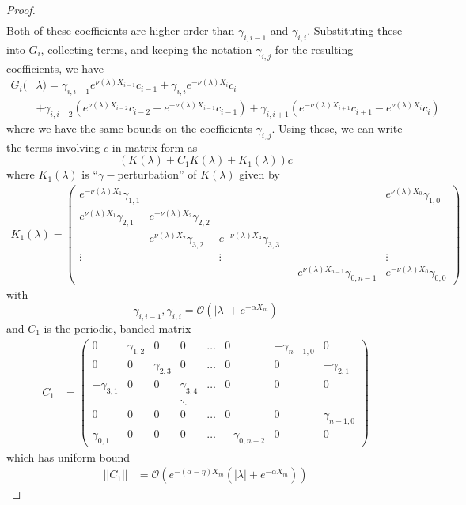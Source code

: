 \documentclass[thesis.tex]{subfiles}
\begin{document}
\begin{lemma}
\begin{proof}
\begin{align*}
\end{align*}
Both of these coefficients are higher order than $\gamma_{i,i-1}$ and $\gamma_{i,i}$. Substituting these into $G_i$, collecting terms, and keeping the notation $\gamma_{i,j}$ for the resulting coefficients, we have
\begin{align*}
G_i(&\lambda) = \gamma_{i,i-1} e^{\nu(\lambda)X_{i-1}}c_{i-1} + \gamma_{i,i} e^{-\nu(\lambda)X_i}c_i \\
&+ \gamma_{i,i-2} ( e^{\nu(\lambda)X_{i-2}}c_{i-2} - e^{-\nu(\lambda)X_{i-1}}c_{i-1}) + \gamma_{i,i+1} (e^{-\nu(\lambda)X_{i+1}}c_{i+1} - e^{\nu(\lambda)X_i}c_i)
\end{align*}
where we have the same bounds on the coefficients $\gamma_{i,j}$. Using these, we can write the terms involving $c$ in matrix form as
\[
(K(\lambda) + C_1 K(\lambda) + K_1(\lambda)) c
\]
where $K_1(\lambda)$ is ``$\gamma-$perturbation'' of $K(\lambda)$ given by
\begin{align*}
K_1(\lambda) =  
\begin{pmatrix}
e^{-\nu(\lambda)X_1} \gamma_{1,1} & & & & & e^{\nu(\lambda)X_0}\gamma_{1,0} \\
e^{\nu(\lambda)X_1}\gamma_{2,1} & e^{-\nu(\lambda)X_2}\gamma_{2,2} \\
& e^{\nu(\lambda)X_2}\gamma_{3,2} & e^{-\nu(\lambda)X_3}\gamma_{3,3} \\
\vdots & & \vdots & &&  \vdots \\
& & & & e^{\nu(\lambda)X_{n-1}}\gamma_{0,n-1} & e^{-\nu(\lambda)X_0}\gamma_{0,0} 
\end{pmatrix}
\end{align*}
with 
\[
\gamma_{i,i-1}, \gamma_{i,i} = \mathcal{O}(|\lambda| + e^{-\alpha X_m})
\] 
and $C_1$ is the periodic, banded matrix
\begin{align*}
C_1 &= \begin{pmatrix}
0 & \gamma_{1,2} & 0 & 0 & \dots & 0 & -\gamma_{n-1,0} & 0 \\
0 & 0 & \gamma_{2,3} & 0 & \dots & 0 & 0 & -\gamma_{2,1} \\
-\gamma_{3,1} & 0 & 0 & \gamma_{3,4} & \dots & 0 & 0 & 0 \\
&  & & \ddots  \\
0 & 0 & 0 & 0 & \dots & 0 & 0 & \gamma_{n-1,0} \\
\gamma_{0,1} & 0 & 0 & 0 & \dots & -\gamma_{0, n-2} & 0 & 0 
\end{pmatrix}
\end{align*}
which has uniform bound
\begin{align*}
||C_1|| &= 
\mathcal{O}(e^{-(\alpha - \eta) X_m}(|\lambda| + e^{-\alpha X_m}))
\end{align*}


\end{proof}
\end{lemma}
\end{document}

